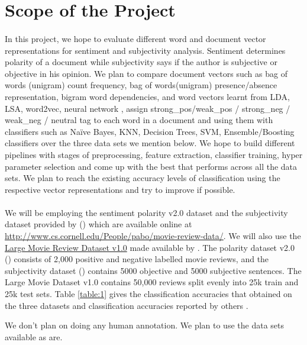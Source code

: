 \documentclass[11pt, oneside]{article}
\begin{document}
\section*{Scope of the Project}
\paragraph{}
In this project, we hope to evaluate different word and document vector representations for sentiment and subjectivity analysis. Sentiment determines polarity of a document while subjectivity says if the author is subjective or objective in his opinion. We plan to compare document vectors such as bag of words (unigram) count frequency, bag of words(unigram) presence/absence representation, bigram word dependencies, and word vectors learnt from LDA, LSA, word2vec, neural network , assign strong\_pos/weak\_pos / strong\_neg / weak\_neg / neutral tag to each word in a document and using them with classifiers such as Naïve Bayes, KNN, Decision Trees, SVM, Ensemble/Boosting classifiers over the three data sets we mention below. We hope to build different pipelines with stages of preprocessing, feature extraction, classifier training, hyper parameter selection and come up with the best that performs across all the data sets. We plan to reach the existing accuracy levels of classification using the respective vector representations and try to improve if possible.
\paragraph{}
We will be employing the sentiment polarity v2.0 dataset and the subjectivity dataset provided by (\cite{pang2004sentimental}) which are available online at \url{http://www.cs.cornell.edu/People/pabo/movie-review-data/}. We will also use the \href{http://ai.stanford.edu/~amaas/data/sentiment/}{Large Movie Review Dataset v1.0} made available by \cite{maas2011learning}. The polarity dataset v2.0 (\cite{pang2004sentimental}) consists of 2,000 positive and negative labelled movie reviews, and the subjectivity dataset (\cite{pang2004sentimental}) contains 5000 objective and 5000 subjective sentences. The Large Movie Dataset v1.0 \cite{maas2011learning}contains 50,000 reviews split evenly into 25k train and 25k test sets. Table \ref{table:1} gives the classification accuracies that \cite{maas2011learning} obtained on the three datasets and classification accuracies reported by others \cite{sadeghianbag}.

We don't plan on doing any human annotation. We plan to use the data sets available as are.
\end{document}
